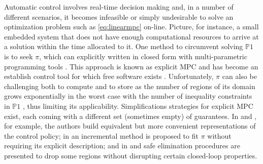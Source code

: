 Automatic control involves real-time decision making and, in a number of different scenarios, it becomes infeasible or simply undesirable to solve an optimization problem such as \eqref{eq:linearmpc} on-line. Picture, for instance, a small embedded system that does not have enough computational resources to arrive at a solution within the time allocated to it. One method to circumvent solving $\mathds{P}1$ is to seek $\pi$, which can explicitly written in closed form with multi-parametric programming tools \citep{bemporad2002explicit}. This approach is known as explicit MPC and has become an establish control tool \citep{mariethoz2008explicit,naus2010design} for which free software exists \citep{herceg2013multi}. Unfortunately, $\pi$ can also be challenging both to compute and to store as the number of regions of its domain grows exponentially in the worst case with the number of inequality constraints in $\mathds{P}1$ \citep{alessio2009survey}, thus limiting its applicability. Simplifications strategies for explicit MPC exist, each coming with a different set (sometimes empty) of guarantees. In \cite{geyer2008optimal} and \cite{wen2009analytical}, for example, the authors build equivalent but more convenient representations of the control policy; in \cite{jones2008double} an incremental method is proposed to fit $\pi$ without requiring its explicit description; and in \cite{christophersen2007controller} and \cite{maddalena2019robust} safe elimination procedures are presented to drop some regions without disrupting certain closed-loop properties.


